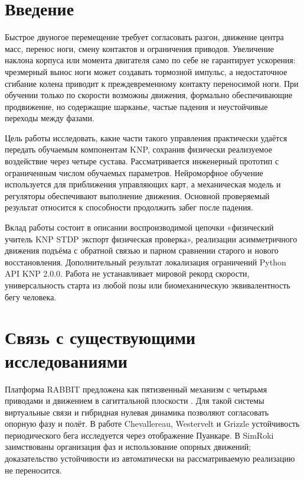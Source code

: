 \documentclass[11pt,a4paper]{article}
\begin{document}
\section{Введение}
Быстрое двуногое перемещение требует согласовать разгон, движение центра масс, перенос ноги, смену контактов и ограничения приводов. Увеличение наклона корпуса или момента двигателя само по себе не гарантирует ускорения: чрезмерный вынос ноги может создавать тормозной импульс, а недостаточное сгибание колена приводит к преждевременному контакту переносимой ноги. При обучении только по скорости возможны движения, формально обеспечивающие продвижение, но содержащие шарканье, частые падения и неустойчивые переходы между фазами.

Цель работы \textemdash{} исследовать, какие части такого управления практически удаётся передать обучаемым компонентам KNP, сохранив физически реализуемое воздействие через четыре сустава. Рассматривается инженерный прототип с ограниченным числом обучаемых параметров. Нейроморфное обучение используется для приближения управляющих карт, а механическая модель и регуляторы обеспечивают выполнение движения. Основной проверяемый результат относится к способности продолжить забег после падения.

Вклад работы состоит в описании воспроизводимой цепочки «физический учитель \textemdash{} KNP STDP \textemdash{} экспорт \textemdash{} физическая проверка», реализации асимметричного движения подъёма с обратной связью и парном сравнении старого и нового восстановления. Дополнительный результат \textemdash{} локализация ограничений Python API KNP 2.0.0. Работа не устанавливает мировой рекорд скорости, универсальность старта из любой позы или биомеханическую эквивалентность бегу человека.

\section{Связь с существующими исследованиями}
Платформа RABBIT предложена как пятизвенный механизм с четырьмя приводами и движением в сагиттальной плоскости \cite{rabbit}. Для такой системы виртуальные связи и гибридная нулевая динамика позволяют согласовать опорную фазу и полёт. В работе Chevallereau, Westervelt и Grizzle \cite{running} устойчивость периодического бега исследуется через отображение Пуанкаре. В SimRoki заимствованы организация фаз и использование опорных движений; доказательство устойчивости из \cite{running} автоматически на рассматриваемую реализацию не переносится.
\end{document}
